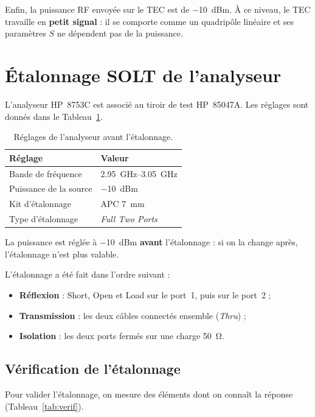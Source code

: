 \documentclass[12pt,a4paper]{article}
\begin{document}
Enfin, la puissance RF envoyée sur le TEC est de \SI{-10}{dBm}. À ce niveau, le TEC travaille en
\textbf{petit signal} : il se comporte comme un quadripôle linéaire et ses paramètres $S$ ne
dépendent pas de la puissance.

\section{Étalonnage SOLT de l’analyseur}

L’analyseur HP~8753C est associé au tiroir de test HP~85047A. Les réglages sont donnés dans le
Tableau~\ref{tab:reglages}.

\begin{table}[H]
\centering
\begin{tabular}{ll}
\toprule
\textbf{Réglage} & \textbf{Valeur} \\
\midrule
Bande de fréquence          & \SIrange{2,95}{3,05}{\giga\hertz} \\
Puissance de la source      & \SI{-10}{dBm} \\
Kit d’étalonnage            & APC \SI{7}{\milli\metre} \\
Type d’étalonnage           & \textit{Full Two Ports} \\
\bottomrule
\end{tabular}
\caption{Réglages de l’analyseur avant l’étalonnage.}
\label{tab:reglages}
\end{table}

La puissance est réglée à \SI{-10}{dBm} \textbf{avant} l’étalonnage : si on la change après,
l’étalonnage n’est plus valable.

L’étalonnage a été fait dans l’ordre suivant :
\begin{itemize}
  \item \textbf{Réflexion} : Short, Open et Load sur le port~1, puis sur le port~2 ;
  \item \textbf{Transmission} : les deux câbles connectés ensemble (\textit{Thru}) ;
  \item \textbf{Isolation} : les deux ports fermés sur une charge \SI{50}{\ohm}.
\end{itemize}

\subsection{Vérification de l’étalonnage}

Pour valider l’étalonnage, on mesure des éléments dont on connaît la réponse
(Tableau~\ref{tab:verif}).
\end{document}
